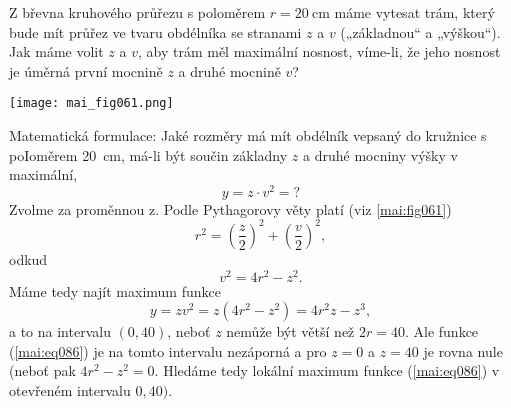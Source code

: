 \begin{mdframed}[style=mdexam]
  \begin{example}\label{teo:exam091}
    Z břevna kruhového průřezu s poloměrem \(r = \SI{20}{\cm}\) máme vytesat trám, který bude mít
    průřez ve tvaru obdélníka se stranami \(z\) a \(v\) („základnou“ a „výškou“). Jak máme volit
    \(z\) a \(v\), aby trám měl maximální nosnost, víme-li, že jeho nosnost je úměrná první mocnině
    \(z\) a druhé mocnině \(v\)?
    
    {\centering
      \captionsetup{type=figure}
      \texttt{[image: mai\_fig061.png]} 
      \label{mai:fig061}
    \par}
    
    Matematická formulace: Jaké rozměry má mít obdélník vepsaný do kružnice s poIoměrem
    \SI{20}{\cm}, má-li být součin základny \(z\) a druhé mocniny výšky v maximální,
    \begin{equation*}
      y = z\cdot v^2 = ?
    \end{equation*}
    Zvolme za proměnnou z. Podle Pythagorovy věty platí (viz \ref{mai:fig061})
    \begin{equation*}
        r^2 = \left(\dfrac{z}{2}\right)^2 + \left(\dfrac{v}{2}\right)^2,
    \end{equation*}
    odkud 
    \begin{equation*}
        v^2 = 4r^2 - z^2.
    \end{equation*}
    Máme tedy najít maximum funkce
    \begin{equation}\label{mai:eq086}
        y = zv^2 = z(4r^2 - z^2) = 4r^2z - z^3,
    \end{equation}
    a to na intervalu \((0,40)\), neboť \(z\) nemůže být větší než \(2r = 40\). Ale funkce
    (\ref{mai:eq086}) je na tomto intervalu nezáporná a pro \(z = 0\) a \(z = 40\) je rovna nule
    (neboť pak \(4r^2 - z^2 = 0\). Hledáme tedy lokální maximum funkce (\ref{mai:eq086}) v otevřeném
    intervalu \(0,40)\). 


\end{example}
\end{mdframed}
